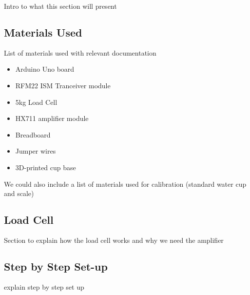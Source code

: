 Intro to what this section will present

\subsection{Materials Used}
List of materials used with relevant documentation

\begin{itemize}
  \item Arduino Uno board
  \item RFM22 ISM Tranceiver module
  \item 5kg Load Cell
  \item HX711 amplifier module
  \item Breadboard
  \item Jumper wires
  \item 3D-printed cup base
\end{itemize}

We could also include a list of materials used for calibration (standard water cup and scale)

\subsection{Load Cell}
Section to explain how the load cell works and why we need the amplifier

\subsection{Step by Step Set-up}
explain step by step set up 